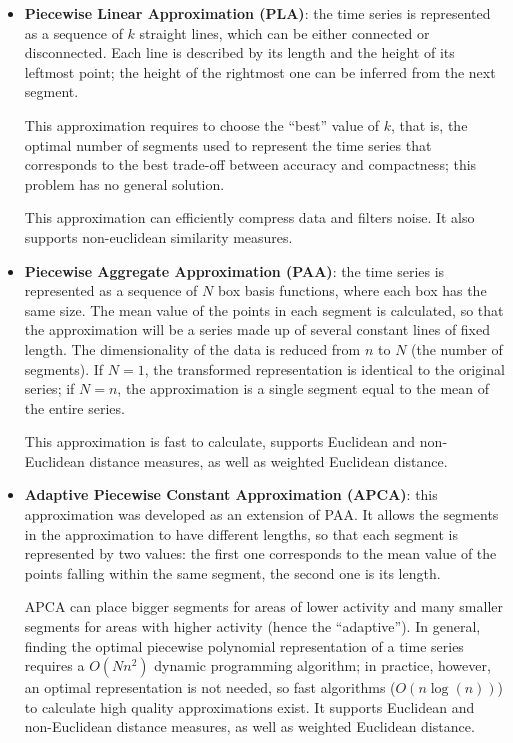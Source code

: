 \begin{itemize}
    \item \textbf{Piecewise Linear Approximation (PLA)}: the time series is represented as a sequence of $k$ straight lines, which can be either connected or disconnected. Each line is described by its length and the height of its leftmost point; the height of the rightmost one can be inferred from the next segment.
    
    This approximation requires to choose the ``best'' value of $k$, that is, the optimal number of segments used to represent the time series that corresponds to the best trade-off between accuracy and compactness; this problem has no general solution.

    This approximation can efficiently compress data and filters noise. It also supports non-euclidean similarity measures.

    \item \textbf{Piecewise Aggregate Approximation (PAA)}: the time series is represented as a sequence of $N$ box basis functions, where each box has the same size. The mean value of the points in each segment is calculated, so that the approximation will be a series made up of several constant lines of fixed length. The dimensionality of the data is reduced from $n$ to $N$ (the number of segments). If $N=1$, the transformed representation is identical to the original series; if $N=n$, the approximation is a single segment equal to the mean of the entire series.

    This approximation is fast to calculate, supports Euclidean and non-Euclidean distance measures, as well as weighted Euclidean distance.
    
    \item \textbf{Adaptive Piecewise Constant Approximation (APCA)}: this approximation was developed as an extension of PAA. It allows the segments in the approximation to have different lengths, so that each segment is represented by two values: the first one corresponds to the mean value of the points falling within the same segment, the second one is its length.

    APCA can place bigger segments for areas of lower activity and many smaller segments for areas with higher activity (hence the ``adaptive''). In general, finding the optimal piecewise polynomial representation of a time series requires a $O(Nn^2)$ dynamic programming algorithm; in practice, however, an optimal representation is not needed, so fast algorithms ($O(n \log(n))$) to calculate high quality approximations exist. It supports Euclidean and non-Euclidean distance measures, as well as weighted Euclidean distance.


\end{itemize}
